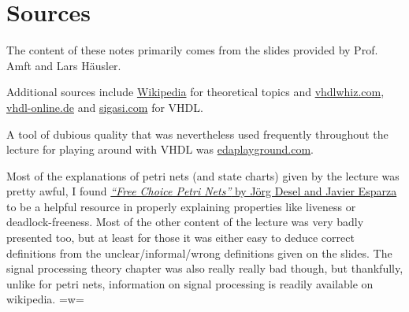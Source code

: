 \documentclass{report}
\newcommand*{\newpar}{\par\vspace{\baselineskip}\noindent} %
\begin{document}
\chapter{Sources}
\thispagestyle{fancy}
The content of these notes primarily comes from the slides provided by Prof. Amft and Lars Häusler.
\newpar
Additional sources include \href{http://www.en.wikipedia.org}{Wikipedia} for theoretical topics and \href{http://www.vhdlwhiz.com}{vhdlwhiz.com}, \href{http://www.vhdl-online.de}{vhdl-online.de} and \href{https://www.sigasi.com/tech/}{sigasi.com} for VHDL.
\newpar
A tool of dubious quality that was nevertheless used frequently throughout the lecture for playing around with VHDL was \href{https://www.edaplayground.com}{edaplayground.com}.
\newpar
Most of the explanations of petri nets (and state charts) given by the lecture was pretty awful, I found \href{https://www7.in.tum.de/~esparza/fcbook-middle.pdf}{\textit{``Free Choice Petri Nets''} by Jörg Desel and Javier Esparza} to be a helpful resource in properly explaining properties like liveness or deadlock-freeness. Most of the other content of the lecture was very badly presented too, but at least for those it was either easy to deduce correct definitions from the unclear/informal/wrong definitions given on the slides. The signal processing theory chapter was also really really bad though, but thankfully, unlike for petri nets, information on signal processing is readily available on wikipedia. =w=
\end{document}

